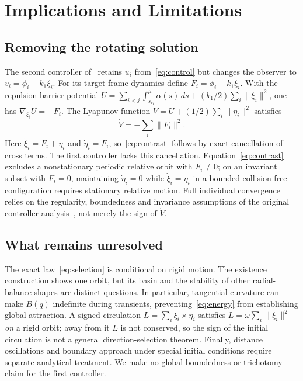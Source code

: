 \documentclass[conference]{IEEEtran}
\newcommand{\norm}[1]{\lVert#1\rVert}
\begin{document}
\section{Implications and Limitations}
\label{sec:discussion}
\subsection{Removing the rotating solution}
\label{sec:second}
The second controller of~\cite{kou2022} retains $u_i$ from~\eqref{eq:control} but changes the observer to $\dot v_i=\phi_i-k_1\xi_i$. For its target-frame dynamics define $F_i=\phi_i-k_1\xi_i$. With the repulsion-barrier potential $U=\sum_{i<j}\int_{s_{ij}}^{\mu}\alpha(s)\,ds+(k_1/2)\sum_i\norm{\xi_i}^2$, one has $\nabla_{\xi_i}U=-F_i$. The Lyapunov function $V=U+(1/2)\sum_i\norm{\eta_i}^2$ satisfies
\begin{equation}
 \dot V=-\sum_i\norm{F_i}^2.\label{eq:contrast}
\end{equation}
Here $\dot\xi_i=F_i+\eta_i$ and $\dot\eta_i=F_i$, so~\eqref{eq:contrast} follows by exact cancellation of cross terms. The first controller lacks this cancellation. Equation~\eqref{eq:contrast} excludes a nonstationary periodic relative orbit with $F_i\ne0$; on an invariant subset with $F_i=0$, maintaining $\dot\eta_i=0$ while $\dot\xi_i=\eta_i$ in a bounded collision-free configuration requires stationary relative motion. Full individual convergence relies on the regularity, boundedness and invariance assumptions of the original controller analysis~\cite{kou2022}, not merely the sign of $\dot V$.

\subsection{What remains unresolved}
The exact law~\eqref{eq:selection} is conditional on rigid motion. The existence construction shows one orbit, but its basin and the stability of other radial-balance shapes are distinct questions. In particular, tangential curvature can make $B(q)$ indefinite during transients, preventing~\eqref{eq:energy} from establishing global attraction. A signed circulation $L=\sum_i\xi_i\times\eta_i$ satisfies $L=\omega\sum_i\norm{\xi_i}^2$ \emph{on} a rigid orbit; away from it $L$ is not conserved, so the sign of the initial circulation is not a general direction-selection theorem. Finally, distance oscillations and boundary approach under special initial conditions require separate analytical treatment. We make no global boundedness or trichotomy claim for the first controller.
\end{document}
